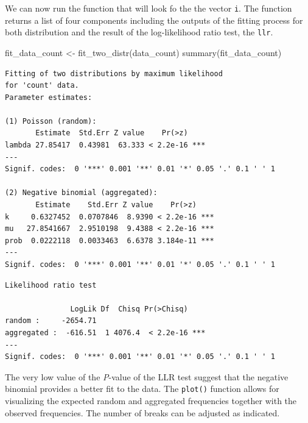 \documentclass[
  letterpaper,
  DIV=11,
  numbers=noendperiod]{scrreprt}
\newenvironment{Shaded}{\begin{snugshade}}{\end{snugshade}}
\newcommand{\FunctionTok}[1]{\textcolor[rgb]{0.28,0.35,0.67}{#1}}
\newcommand{\NormalTok}[1]{\textcolor[rgb]{0.00,0.23,0.31}{#1}}
\newcommand{\OtherTok}[1]{\textcolor[rgb]{0.00,0.23,0.31}{#1}}
\newcommand{\SpecialCharTok}[1]{\textcolor[rgb]{0.37,0.37,0.37}{#1}}
\begin{document}
We can now run the function that will look fo the the vector \texttt{i}.
The function returns a list of four components including the outputs of
the fitting process for both distribution and the result of the
log-likelihood ratio test, the \texttt{llr}.

\begin{Shaded}
\begin{Highlighting}[]
\NormalTok{fit\_data\_count }\OtherTok{\textless{}{-}} \FunctionTok{fit\_two\_distr}\NormalTok{(data\_count)}
\FunctionTok{summary}\NormalTok{(fit\_data\_count)}
\end{Highlighting}
\end{Shaded}

\begin{verbatim}
Fitting of two distributions by maximum likelihood
for 'count' data.
Parameter estimates:

(1) Poisson (random):
       Estimate  Std.Err Z value    Pr(>z)    
lambda 27.85417  0.43981  63.333 < 2.2e-16 ***
---
Signif. codes:  0 '***' 0.001 '**' 0.01 '*' 0.05 '.' 0.1 ' ' 1

(2) Negative binomial (aggregated):
       Estimate    Std.Err Z value    Pr(>z)    
k     0.6327452  0.0707846  8.9390 < 2.2e-16 ***
mu   27.8541667  2.9510198  9.4388 < 2.2e-16 ***
prob  0.0222118  0.0033463  6.6378 3.184e-11 ***
---
Signif. codes:  0 '***' 0.001 '**' 0.01 '*' 0.05 '.' 0.1 ' ' 1
\end{verbatim}

\begin{Shaded}
\end{Shaded}

\begin{verbatim}
Likelihood ratio test

               LogLik Df  Chisq Pr(>Chisq)    
random :     -2654.71                         
aggregated :  -616.51  1 4076.4  < 2.2e-16 ***
---
Signif. codes:  0 '***' 0.001 '**' 0.01 '*' 0.05 '.' 0.1 ' ' 1
\end{verbatim}

The very low value of the \emph{P}-value of the LLR test suggest that
the negative binomial provides a better fit to the data. The
\texttt{plot()} function allows for visualizing the expected random and
aggregated frequencies together with the observed frequencies. The
number of breaks can be adjusted as indicated.
\end{document}
